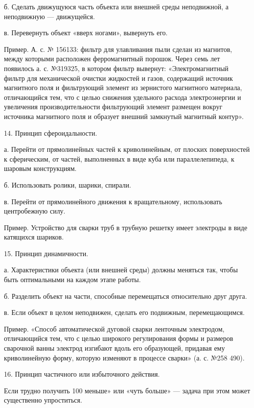 б. Сделать движущуюся  часть объекта или внешней  среды неподвижной, а
неподвижную — движущейся.

в. Перевернуть объект «вверх ногами», вывернуть его.

Пример.  А.  с.  №  156133:  фильтр для  улавливания  пыли  сделан  из
магнитов,  между  которыми  расположен ферромагнитный  порошок.  Через
семь  лет  появилось  а.  с.   №319325,  в  котором  фильтр  вывернут:
«Электромагнитный   фильтр  для   механической  очистки   жидкостей  и
газов,  содержащий  источник  магнитного поля  и  фильтрующий  элемент
из   зернистого  магнитного   материала,  отличающийся   тем,  что   с
целью   снижения  удельного   расхода   электроэнергии  и   увеличения
производительности  фильтрующий  элемент   размещен  вокруг  источника
магнитного поля и образует внешний замкнутый магнитный контур».

14. Принцип сфероидальности.

а.  Перейти  от  прямолинейных  частей  к  криволинейным,  от  плоских
поверхностей к  сферическим, от  частей, выполненных  в виде  куба или
параллелепипеда, к шаровым конструкциям.

б. Использовать ролики, шарики, спирали.

в. Перейти  от прямолинейного  движения к  вращательному, использовать
центробежную силу.

Пример. Устройство для сварки труб в трубную решетку имеет электроды в
виде катящихся шариков.

15. Принцип динамичности.

а.  Характеристики объекта  (или внешней  среды) должны  меняться так,
чтобы быть оптимальными на каждом этапе работы.

б. Разделить объект на части, способные перемещаться относительно друг
друга.

в.   Если  объект   в   целом  неподвижен,   сделать  его   подвижным,
перемещающимся.

Пример.  «Способ автоматической  дуговой сварки  ленточным электродом,
отличающийся тем, что с целью  широкого регулирования формы и размеров
сварочной ванны  электрод изгибают вдоль его  образующей, придавая ему
криволинейную форму, которую  изменяют в процессе сварки»  (а. с. №258
490).

16. Принцип частичного или избыточного действия.

Если  трудно получить  100%
меньше»  или  «чуть  больше»  —  задача  при  этом  может  существенно
упроститься.

